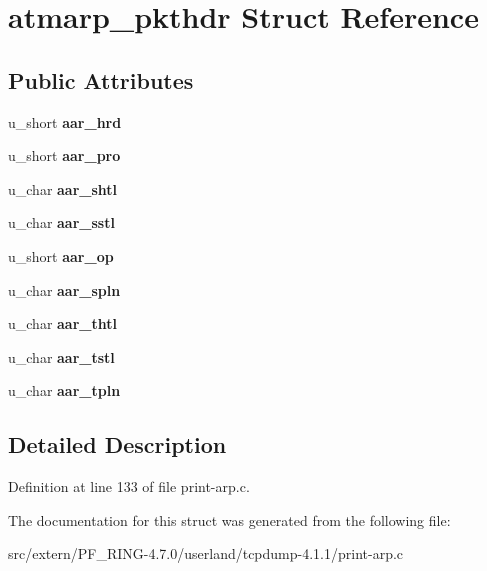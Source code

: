 \hypertarget{structatmarp__pkthdr}{
\section{atmarp\_\-pkthdr Struct Reference}
\label{structatmarp__pkthdr}
}
\subsection*{Public Attributes}
\begin{DoxyCompactItemize}
\item 
\hypertarget{structatmarp__pkthdr_a43cf67955b989536def10e8c0e1a979e}{
u\_\-short {\bfseries aar\_\-hrd}}
\label{structatmarp__pkthdr_a43cf67955b989536def10e8c0e1a979e}

\item 
\hypertarget{structatmarp__pkthdr_a3d3767bb8e590bd9a4cf7be3b55375af}{
u\_\-short {\bfseries aar\_\-pro}}
\label{structatmarp__pkthdr_a3d3767bb8e590bd9a4cf7be3b55375af}

\item 
\hypertarget{structatmarp__pkthdr_af766b664e91aba5efada62cca89e061a}{
u\_\-char {\bfseries aar\_\-shtl}}
\label{structatmarp__pkthdr_af766b664e91aba5efada62cca89e061a}

\item 
\hypertarget{structatmarp__pkthdr_a4a77f7e08e712decaf9ca8030c8fe60d}{
u\_\-char {\bfseries aar\_\-sstl}}
\label{structatmarp__pkthdr_a4a77f7e08e712decaf9ca8030c8fe60d}

\item 
\hypertarget{structatmarp__pkthdr_a9d570cddcd8a063a5d3bbc38c9ade7f0}{
u\_\-short {\bfseries aar\_\-op}}
\label{structatmarp__pkthdr_a9d570cddcd8a063a5d3bbc38c9ade7f0}

\item 
\hypertarget{structatmarp__pkthdr_a1e702ea4d75abc31461be9e64d65cc4a}{
u\_\-char {\bfseries aar\_\-spln}}
\label{structatmarp__pkthdr_a1e702ea4d75abc31461be9e64d65cc4a}

\item 
\hypertarget{structatmarp__pkthdr_a95713fcc2ec516fc4a3e72f4dded2db2}{
u\_\-char {\bfseries aar\_\-thtl}}
\label{structatmarp__pkthdr_a95713fcc2ec516fc4a3e72f4dded2db2}

\item 
\hypertarget{structatmarp__pkthdr_a149a16d9edbb2c6152e0ddf26d06c5a1}{
u\_\-char {\bfseries aar\_\-tstl}}
\label{structatmarp__pkthdr_a149a16d9edbb2c6152e0ddf26d06c5a1}

\item 
\hypertarget{structatmarp__pkthdr_aa15a57b50b7505377a26b3d41df5c11d}{
u\_\-char {\bfseries aar\_\-tpln}}
\label{structatmarp__pkthdr_aa15a57b50b7505377a26b3d41df5c11d}

\end{DoxyCompactItemize}


\subsection{Detailed Description}


Definition at line 133 of file print-\/arp.c.



The documentation for this struct was generated from the following file:\begin{DoxyCompactItemize}
\item 
src/extern/PF\_\-RING-\/4.7.0/userland/tcpdump-\/4.1.1/print-\/arp.c\end{DoxyCompactItemize}
